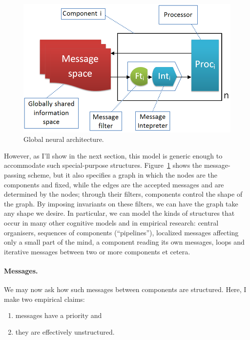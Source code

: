 %
\begin{figure}[!h]
	\centering
	\includegraphics[width=400pt]{Figs/global.png}
	\caption{Global neural architecture.}
	\label{fig:global}
\end{figure}

However, as I'll show in the next section, this model is generic enough to accommodate such special-purpose structures. Figure~\ref{fig:global} shows the message-passing scheme, but it also specifies a graph in which the nodes are the components and fixed, while the edges are the accepted messages and are determined by the nodes; through their filters, components control the shape of the graph. By imposing invariants on these filters, we can have the graph take any shape we desire. In particular, we can model the kinds of structures that occur in many other cognitive models and in empirical research: central organisers, sequences of components (``pipelines''), localized messages affecting only a small part of the mind, a component reading its own messages, loops and iterative messages between two or more components et cetera.

\pagebreak

\paragraph{Messages.}

We may now ask how such messages between components are structured. Here, I make two empirical claims:
\begin{enumerate}
	\item messages have a priority and
	\item they are effectively unstructured.
\end{enumerate}

